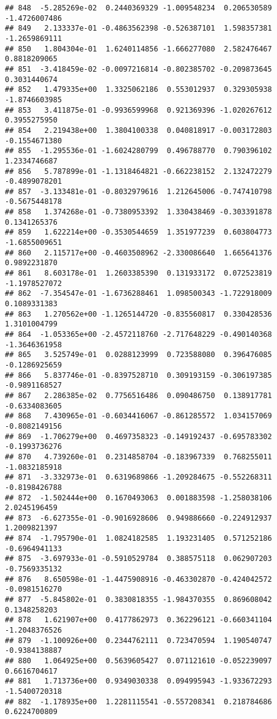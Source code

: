 \documentclass[
]{article}
\begin{document}
\begin{verbatim}
## 848  -5.285269e-02  0.2440369329 -1.009548234  0.206530589 -1.4726007486
## 849   2.133337e-01 -0.4863562398 -0.526387101  1.598357381 -1.2659869111
## 850   1.804304e-01  1.6240114856 -1.666277080  2.582476467  0.8818209065
## 851  -3.418459e-02 -0.0097216814 -0.802385702 -0.209873645  0.3031440674
## 852   1.479335e+00  1.3325062186  0.553012937  0.329305938 -1.8746603985
## 853   3.411875e-01 -0.9936599968  0.921369396 -1.020267612  0.3955275950
## 854   2.219438e+00  1.3804100338  0.040818917 -0.003172803 -0.1554671380
## 855  -1.295536e-01 -1.6024280799  0.496788770  0.790396102  1.2334746687
## 856   5.787899e-01 -1.1318464821 -0.662238152  2.132472279 -0.4899078201
## 857  -3.133481e-01 -0.8032979616  1.212645006 -0.747410798 -0.5675448178
## 858   1.374268e-01 -0.7380953392  1.330438469 -0.303391878  0.1341265376
## 859   1.622214e+00 -0.3530544659  1.351977239  0.603804773 -1.6855009651
## 860   2.115717e+00 -0.4603508962 -2.330086640  1.665641376  0.9892231870
## 861   8.603178e-01  1.2603385390  0.131933172  0.072523819 -1.1978527072
## 862  -7.354547e-01 -1.6736288461  1.098500343 -1.722918009  0.1089331383
## 863   1.270562e+00 -1.1265144720 -0.835560817  0.330428536  1.3101004799
## 864  -1.053365e+00 -2.4572118760 -2.717648229 -0.490140368 -1.3646361958
## 865   3.525749e-01  0.0288123999  0.723588080  0.396476085 -0.1286925659
## 866   5.837746e-01 -0.8397528710  0.309193159 -0.306197385 -0.9891168527
## 867   2.286385e-02  0.7756516486  0.090486750  0.138917781 -0.6334083605
## 868   7.430965e-01 -0.6034416067 -0.861285572  1.034157069 -0.8082149156
## 869  -1.706279e+00  0.4697358323 -0.149192437 -0.695783302 -0.1993736276
## 870   4.739260e-01  0.2314858704 -0.183967339  0.768255011 -1.0832185918
## 871  -3.332973e-01  0.6319689866 -1.209284675 -0.552268311 -0.8198426788
## 872  -1.502444e+00  0.1670493063  0.001883598 -1.258038106  2.0245196459
## 873  -6.627355e-01 -0.9016928606  0.949886660 -0.224912937  1.2009821397
## 874  -1.795790e-01  1.0824182585  1.193231405  0.571252186 -0.6964941133
## 875  -3.697933e-01 -0.5910529784  0.388575118  0.062907203 -0.7569335132
## 876   8.650598e-01 -1.4475908916 -0.463302870 -0.424042572 -0.0981516270
## 877  -5.845802e-01  0.3830818355 -1.984370355  0.869608042  0.1348258203
## 878   1.621907e+00  0.4177862973  0.362296121 -0.660341104 -1.2048376526
## 879  -1.100926e+00  0.2344762111  0.723470594  1.190540747 -0.9384138887
## 880   1.064925e+00  0.5639605427  0.071121610 -0.052239097  0.6616704617
## 881   1.713736e+00  0.9349030338  0.094995943 -1.933672293 -1.5400720318
## 882  -1.178935e+00  1.2281115541 -0.557208341  0.218784686  0.6224700809

\end{verbatim}
\end{document}
